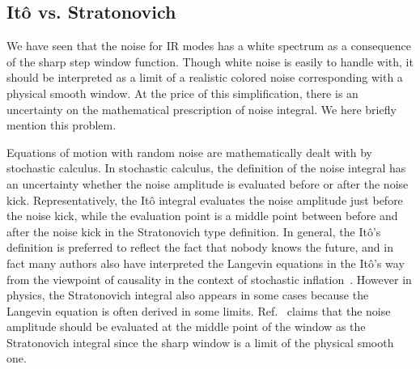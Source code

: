 \documentclass[a4paper,11pt]{article}
\begin{document}
\subsection{It\^o vs. Stratonovich}

We have seen that the noise for IR modes has a white spectrum as a consequence of the sharp step window function.
Though white noise is easily to handle with, it should be interpreted as a limit of a realistic colored noise corresponding with a physical smooth window.
At the price of this simplification, there is an uncertainty on the mathematical prescription of noise integral. We here briefly mention this problem.

Equations of motion with random noise are mathematically dealt with by stochastic calculus.
In stochastic calculus, the definition of the noise integral has an uncertainty whether 
the noise amplitude is evaluated before or after the noise kick.
Representatively, the It\^o integral evaluates the noise amplitude just before the noise kick, while the evaluation point is a middle point between before and after the noise kick in the Stratonovich type definition.
In general, the It\^o's definition is preferred to reflect the fact that nobody knows the future, and in fact many authors also have interpreted the Langevin equations in the It\^o's way from the viewpoint of causality in the context of stochastic inflation~\cite{Salopek:1990re,Vilenkin:1999kd,Tolley:2008na,Fujita:2014tja,Vennin:2015hra,Tokuda:2017fdh}.
However in physics, the Stratonovich integral also appears in some cases because the Langevin equation is often derived in some limits.
Ref.~\cite{Mezhlumian:1991hw} claims that the noise amplitude should be evaluated at the middle point of the window as the Stratonovich integral
since the sharp window is a limit of the physical smooth one.
\end{document}
